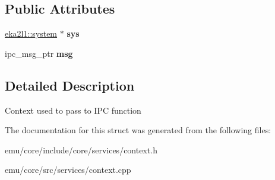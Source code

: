 \subsection*{Public Attributes}
\begin{DoxyCompactItemize}
\item 
\mbox{\label{structeka2l1_1_1service_1_1ipc__context_aaaa662424a66543a0f6a1c59518dd95a}} 
\mbox{\hyperlink{classeka2l1_1_1system}{eka2l1\+::system}} $\ast$ {\bfseries sys}
\item 
\mbox{\label{structeka2l1_1_1service_1_1ipc__context_a72cb7481e148411bf2ca8c790a40ee01}} 
ipc\+\_\+msg\+\_\+ptr {\bfseries msg}
\end{DoxyCompactItemize}


\subsection{Detailed Description}
Context used to pass to I\+PC function 

The documentation for this struct was generated from the following files\+:\begin{DoxyCompactItemize}
\item 
emu/core/include/core/services/context.\+h\item 
emu/core/src/services/context.\+cpp\end{DoxyCompactItemize}
